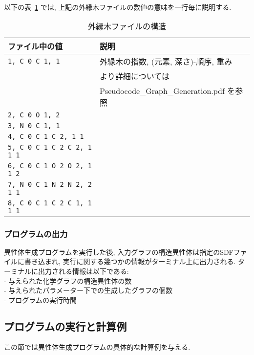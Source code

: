 \documentclass[11pt,titlepage,dvipdfmx,twoside]{jarticle}
\begin{document}
以下の表~\ref{tab:fringeFormat}
では, 上記の外縁木ファイルの数値の意味を一行毎に説明する.

\bigskip
\begin{table}[H]
\begin{center} \caption{外縁木ファイルの構造}
\label{tab:fringeFormat}
  \begin{tabular}{l|l}
  ファイル中の値 & 説明 \\ \hline \hline
{\tt  1, C 0 C 1, 1} & 外縁木の指数, (元素, 深さ)-順序, 重み \\
      & より詳細については \\
      & Pseudocode\_Graph\_Generation.pdf を参照\\  \hline
{\tt 2, C 0 O 1, 2            } &\\
{\tt 3, N 0 C 1, 1            } &\\
{\tt 4, C 0 C 1 C 2, 1 1      } &\\
{\tt 5, C 0 C 1 C 2 C 2, 1 1 1} &\\
{\tt 6, C 0 C 1 O 2 O 2, 1 1 2} &\\
{\tt 7, N 0 C 1 N 2 N 2, 2 1 1} &\\
{\tt 8, C 0 C 1 C 2 C 1, 1 1 1} &\\ \hline
  \end{tabular}
\end{center}
\end{table}


\subsubsection{プログラムの出力}
\label{sec:Output_m}

異性体生成プログラムを実行した後, 
入力グラフの構造異性体は指定のSDFファイルに書き込まれ, 実行に関する幾つかの情報がターミナル上に出力される.
ターミナルに出力される情報は以下である:\\
- 与えられた化学グラフの構造異性体の数 \\
- 与えられたパラメーター下での生成したグラフの個数\\
- プログラムの実行時間
 


\subsection{プログラムの実行と計算例}
\label{sec:Example_m}

この節では異性体生成プログラムの具体的な計算例を与える.
\end{document}
